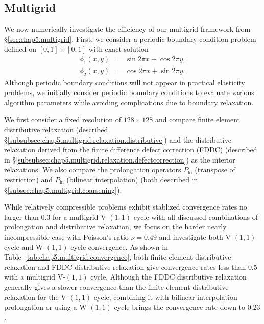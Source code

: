 \subsection{Multigrid} \label{subsec:chap5.examples.multigrid}

We now numerically investigate the efficiency of our multigrid framework from \S\ref{sec:chap5.multigrid}. First, we consider a periodic boundary condition problem defined on $[0,1] \times [0,1]$ with exact solution
\begin{align*}
\phi_1(x,y) & = \sin 2\pi x + \cos 2 \pi y, \\
\phi_2(x,y) & = \cos 2\pi x + \sin 2 \pi y.
\end{align*}
Although periodic boundary conditions will not appear in practical elasticity problems, we initially consider periodic boundary conditions to evaluate various algorithm parameters while avoiding complications due to boundary relaxation.

We first consider a fixed resolution of $128 \times 128$ and compare finite element distributive relaxation (described \S\ref{subsubsec:chap5.multigrid.relaxation.distributive}) and the distributive relaxation derived from the finite difference defect correction (FDDC) (described in \S\ref{subsubsec:chap5.multigrid.relaxation.defectcorrection}) as the interior relaxations. We also compare the prolongation operators $P_{\text{lo}}$ (transpose of restriction) and $P_{\text{hi}}$ (bilinear interpolation) (both described in \S\ref{subsec:chap5.multigrid.coarsening}).

While relatively compressible problems exhibit stablized convergence rates no larger than $0.3$ for a multigrid V-$(1,1)$ cycle with all discussed combinations of prolongation and distributive relaxation, we focus on the harder nearly incompressible case with Poisson's ratio $\nu = 0.49$ and investigate both V-$(1,1)$ cycle and W-$(1,1)$ cycle convergence. As shown in Table~\ref{tab:chap5.multigrid.convergence}, both finite element distributive relaxation and FDDC distributive relaxation give convergence rates less than $0.5$ with a multigrid V-$(1,1)$ cycle. Although the FDDC distributive relaxation generally gives a slower convergence than the finite element distributive relaxation for the V-$(1,1)$ cycle, combining it with bilinear interpolation prolongation or using a W-$(1,1)$ cycle brings the convergence rate down to $0.23$.

